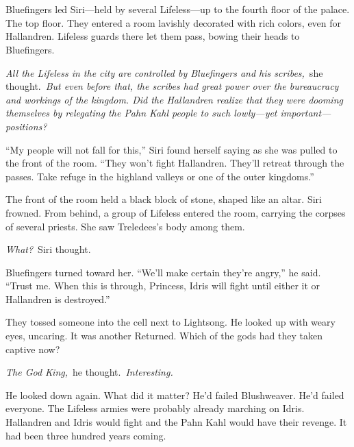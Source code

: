 \chapter{}

Bluefingers led Siri—held by several Lifeless—up to the fourth floor of the palace. The top floor. They entered a room lavishly decorated with rich colors, even for Hallandren. Lifeless guards there let them pass, bowing their heads to Bluefingers.

\textit{All the Lifeless in the city are controlled by Bluefingers and his scribes,}~she thought.~\textit{But even before that, the scribes had great power over the bureaucracy and workings of the kingdom. Did the Hallandren realize that they were dooming themselves by relegating the Pahn Kahl people to such lowly—yet important—positions?}

“My people will not fall for this,” Siri found herself saying as she was pulled to the front of the room. “They won’t fight Hallandren. They’ll retreat through the passes. Take refuge in the highland valleys or one of the outer kingdoms.”

The front of the room held a black block of stone, shaped like an altar. Siri frowned. From behind, a group of Lifeless entered the room, carrying the corpses of several priests. She saw Treledees’s body among them.

\textit{What?}~Siri thought.

Bluefingers turned toward her. “We’ll make certain they’re angry,” he said. “Trust me. When this is through, Princess, Idris will fight until either it or Hallandren is destroyed.”

\orn

They tossed someone into the cell next to Lightsong. He looked up with weary eyes, uncaring. It was another Returned. Which of the gods had they taken captive now?

\textit{The God King,}~he thought.~\textit{Interesting.}

He looked down again. What did it matter? He’d failed Blushweaver. He’d failed everyone. The Lifeless armies were probably already marching on Idris. Hallandren and Idris would fight and the Pahn Kahl would have their revenge. It had been three hundred years coming.

\orn

